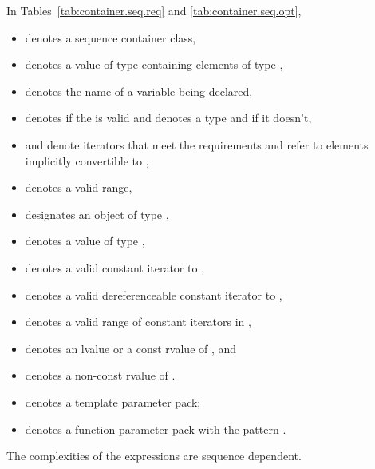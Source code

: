 \pnum
In Tables~\ref{tab:container.seq.req}
and \ref{tab:container.seq.opt},
\begin{itemize}
\item
{} denotes a sequence container class,
\item
{} denotes a value of type  containing elements of type ,
\item
{} denotes the name of a variable being declared,
\item
{} denotes  if
the   is valid and denotes a
type and
 if it doesn't,
\item
{} and 
denote iterators that meet the  requirements
and refer to elements implicitly convertible to ,
\item
{} denotes a valid range,
\item
{} designates an object of type ,
\item
{} denotes a value of type ,
\item
{} denotes a valid constant iterator to ,
\item
{} denotes a valid dereferenceable constant iterator to ,
\item
{} denotes a valid range of constant iterators in ,
\item
{} denotes an lvalue or a const rvalue of , and
\item
{} denotes a non-const rvalue of .
\item
{} denotes a template parameter pack;
\item
{} denotes a function parameter pack with the pattern .
\end{itemize}

\pnum
The complexities of the expressions are sequence dependent.

